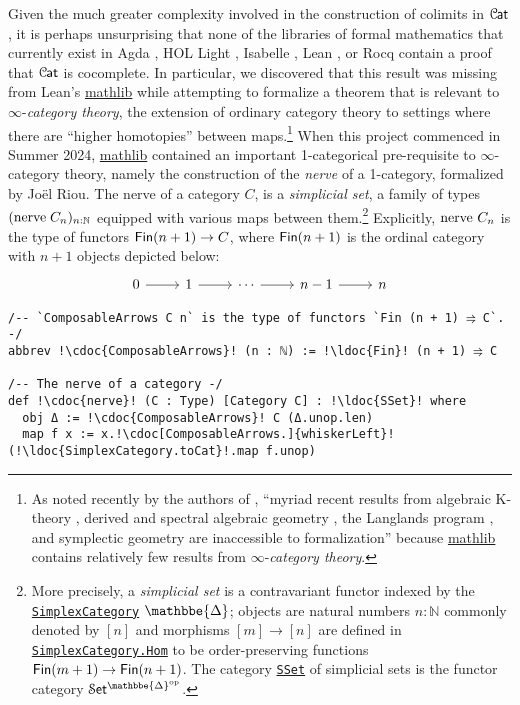 \documentclass[a4paper,UKenglish,cleveref, autoref, thm-restate]{lipics-v2021}
\newcommand{\op}{\textup{op}}
\newcommand{\nerve}{\textup{nerve}}
\newcommand{\cat}[1]{\textup{\textsf{#1}}}%
\newcommand{\NN}{\mathbb{N}}
\newcommand{\1}{\mathbbe{1}}
\newcommand{\2}{\mathbbe{2}}
\newcommand{\3}{\mathbbe{3}}
\newcommand{\DDelta}{\mathbbe{\Delta}}
\newcommand{\Fin}{\cat{Fin}}
\newcommand{\Cat}{\mathcal{C}{\kern-.75pt}\cat{at}}
\newcommand{\Set}{\mathcal{S}\cat{et}}
\newcommand{\libmathlib}{\href{https://github.com/leanprover-community/mathlib}{\textsf{mathlib}}}
\newcommand{\ldoc}[2][]{\href{https://leanprover-community.github.io/mathlib4_docs/find/?pattern=#1#2\#doc}{\texttt{#2}}}
\newcommand{\cdoc}[2][]{\href{https://leanprover-community.github.io/mathlib4_docs/find/?pattern=CategoryTheory.#1#2\#doc}{\texttt{#2}}}
\begin{document}
Given the much greater complexity involved in the construction of colimits in $\Cat$, it is perhaps unsurprising that none of the libraries of formal mathematics that currently exist in Agda \cite{hott-in:agda, HuCarette2021, 1Lab, agda-unimath, VezzosiMoertbergAbel2021}, HOL Light \cite{Harrison2009}, Isabelle \cite{CZH_Foundations-AFP, CZH_Elementary_Categories-AFP, CZH_Universal_Constructions-AFP, NipkoWenzelPaulson2002}, Lean \cite{mathlib2020}, or Rocq \cite{BauerGrossLumsdaineShulmanSozeauSpitters2017,GrossChlipalaSpivak, UniMath} contain a proof that $\Cat$ is cocomplete. In particular, we discovered that this result was missing from Lean's \libmathlib{} while attempting to formalize a theorem that is relevant to $\infty$-\emph{category theory}, the extension of ordinary category theory to settings where there are ``higher homotopies'' between maps.\footnote{As noted recently by the authors of \cite{KRW}, ``myriad recent results from algebraic K-theory \cite{BlumbergGepnerTabuada2013}, derived and spectral algebraic geometry \cite{Lurie2004,Lurie:2018sag}, the Langlands program \cite{FarguesScholze2021}, and symplectic geometry \cite{NadlerTanaka2020} are inaccessible to formalization'' because \libmathlib{}  contains relatively few results from $\infty$-\emph{category theory}.} When this project commenced in Summer 2024, \libmathlib{} contained an important 1-categorical pre-requisite to $\infty$-category theory, namely the construction of the \emph{nerve} of a 1-category, formalized by Jo\"{e}l Riou. The nerve of a category $C$, is a \emph{simplicial set}, a family of types $(\nerve\;C_n)_{n : \NN}$ equipped with various maps between them.\footnote{More precisely, a \emph{simplicial set} is a contravariant functor indexed by the \ldoc{SimplexCategory} $\DDelta$; objects are natural numbers $n : \NN$ commonly denoted by $[n]$ and morphisms $[m] \to [n]$ are defined in \ldoc{SimplexCategory.Hom} to be order-preserving functions $\Fin(m+1) \to \Fin(n+1)$. The category \ldoc{SSet} of simplicial sets is the functor category $\Set^{\DDelta^\op}$.} Explicitly, $\nerve\ C_n$ is the type of functors $\Fin(n+1)\to C$, where $\Fin(n+1)$ is the ordinal category with $n+1$ objects depicted below:
\[ \begin{tikzcd} 0 \arrow[r] & 1 \arrow[r]  & \cdots \arrow[r] & n-1 \arrow[r] &  n \end{tikzcd} \]
\begin{lstlisting}
/-- `ComposableArrows C n` is the type of functors `Fin (n + 1) ⥤ C`. -/
abbrev !\cdoc{ComposableArrows}! (n : ℕ) := !\ldoc{Fin}! (n + 1) ⥤ C

/-- The nerve of a category -/
def !\cdoc{nerve}! (C : Type) [Category C] : !\ldoc{SSet}! where
  obj Δ := !\cdoc{ComposableArrows}! C (Δ.unop.len)
  map f x := x.!\cdoc[ComposableArrows.]{whiskerLeft}! (!\ldoc{SimplexCategory.toCat}!.map f.unop)
\end{lstlisting}
\end{document}
